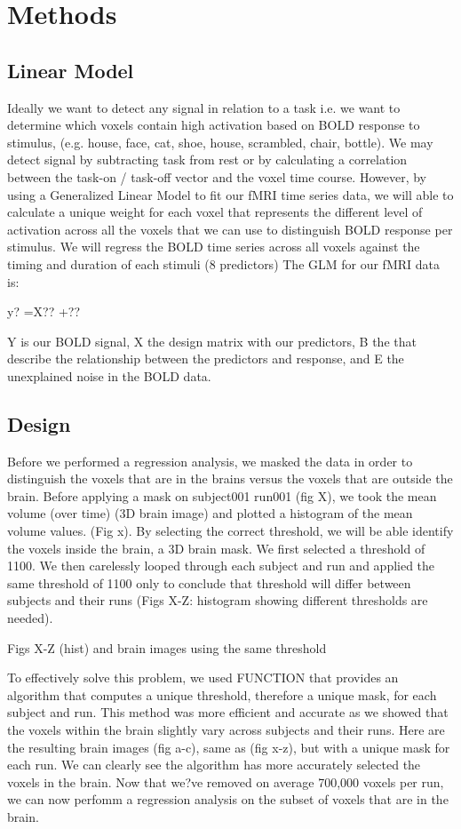 \documentclass[11pt]{article}
\begin{document}
\section{Methods}

\subsection{Linear Model}
Ideally we want to detect any signal in relation to a task i.e. we want to 
determine which voxels contain high activation based on BOLD response to 
stimulus, (e.g. house, face, cat, shoe, house, scrambled, chair, bottle). We 
may detect signal by subtracting task from rest or by calculating a correlation 
between the task-on / task-off vector and the voxel time course. However, by 
using a Generalized Linear Model to fit our fMRI time series data, we will able 
to calculate a unique weight for each voxel that represents the different level 
of activation across all the voxels that we can use to distinguish BOLD 
response per stimulus.  We will regress the BOLD time series across all voxels 
against the timing and duration of each stimuli (8 predictors) The GLM for our 
fMRI data is:

y? =X?? +??

Y is our BOLD signal, X the design matrix with our predictors, B the that 
describe the relationship between the predictors and response, and E the 
unexplained noise in the BOLD data.

\subsection{Design}
Before we performed a regression analysis, we masked the data in order to 
distinguish the voxels that are in the brains versus the voxels that are 
outside the brain. Before applying a mask on subject001 run001 (fig X), we took 
the mean volume (over time) (3D brain image) and plotted a histogram of the 
mean volume values. (Fig x). By selecting the correct threshold, we will be 
able identify the voxels inside the brain, a 3D brain mask. We first selected a 
threshold of 1100. We then carelessly looped through each subject and run and 
applied the same threshold of 1100 only to conclude that threshold will differ 
between subjects and their runs (Figs X-Z: histogram showing different 
thresholds are needed). 

		Figs X-Z (hist) and brain images using the same threshold

To effectively solve this problem, we used FUNCTION that provides an algorithm 
that computes a unique threshold, therefore a unique mask, for each subject and 
run. This method was more efficient and accurate as we showed that the voxels 
within the brain slightly vary  across subjects and their runs. Here are the 
resulting brain images (fig a-c), same as (fig x-z), but with a unique mask for 
each run. We can clearly see the algorithm has  more accurately selected the 
voxels in the brain. Now that we?ve removed on average 700,000 voxels per run, 
we can now perfomm a regression analysis on the subset of voxels that are in 
the brain.    
          
\end{document}
